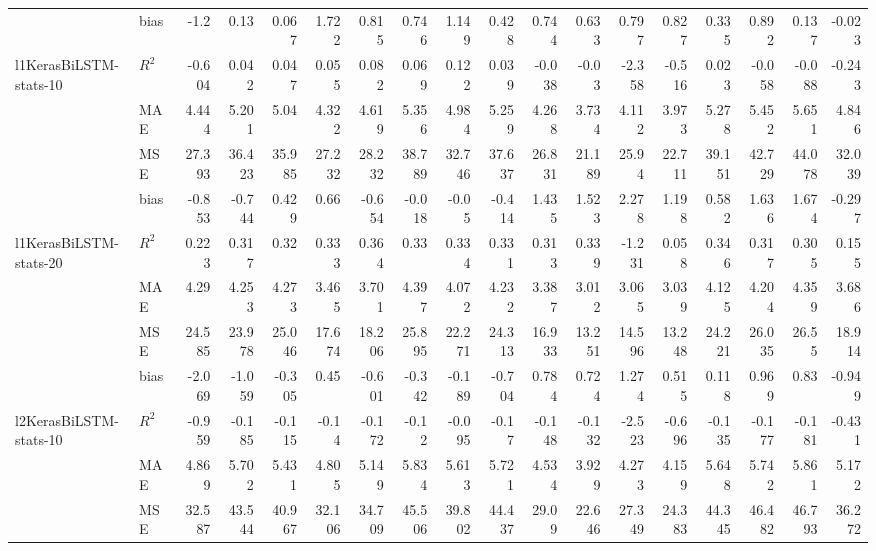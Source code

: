 \begin{tabular}{p{1.5cm}lrrrrrrrrrrrrrrrr}
                        & bias  & -1.2   &  0.13  &  0.067 &  1.722 &  0.815 &  0.746 &  1.149 &  0.428 &  0.744 &  0.633 &  0.797 &  0.827 &  0.335 &  0.892 &  0.137 & -0.023 \\
 l1KerasBiLSTM-stats-10 & $R^2$ & -0.604 &  0.042 &  0.047 &  0.055 &  0.082 &  0.069 &  0.122 &  0.039 & -0.038 & -0.03  & -2.358 & -0.516 &  0.023 & -0.058 & -0.088 & -0.243 \\
                        & MAE   &  4.444 &  5.201 &  5.04  &  4.322 &  4.619 &  5.356 &  4.984 &  5.259 &  4.268 &  3.734 &  4.112 &  3.973 &  5.278 &  5.452 &  5.651 &  4.846 \\
                        & MSE   & 27.393 & 36.423 & 35.985 & 27.232 & 28.232 & 38.789 & 32.746 & 37.637 & 26.831 & 21.189 & 25.94  & 22.711 & 39.151 & 42.729 & 44.078 & 32.039 \\
                        & bias  & -0.853 & -0.744 &  0.429 &  0.66  & -0.654 & -0.018 & -0.05  & -0.414 &  1.435 &  1.523 &  2.278 &  1.198 &  0.582 &  1.636 &  1.674 & -0.297 \\
 l1KerasBiLSTM-stats-20 & $R^2$ &  0.223 &  0.317 &  0.32  &  0.333 &  0.364 &  0.33  &  0.334 &  0.331 &  0.313 &  0.339 & -1.231 &  0.058 &  0.346 &  0.317 &  0.305 &  0.155 \\
                        & MAE   &  4.29  &  4.253 &  4.273 &  3.465 &  3.701 &  4.397 &  4.072 &  4.232 &  3.387 &  3.012 &  3.065 &  3.039 &  4.125 &  4.204 &  4.359 &  3.686 \\
                        & MSE   & 24.585 & 23.978 & 25.046 & 17.674 & 18.206 & 25.895 & 22.271 & 24.313 & 16.933 & 13.251 & 14.596 & 13.248 & 24.221 & 26.035 & 26.55  & 18.914 \\
                        & bias  & -2.069 & -1.059 & -0.305 &  0.45  & -0.601 & -0.342 & -0.189 & -0.704 &  0.784 &  0.724 &  1.274 &  0.515 &  0.118 &  0.969 &  0.83  & -0.949 \\
 l2KerasBiLSTM-stats-10 & $R^2$ & -0.959 & -0.185 & -0.115 & -0.14  & -0.172 & -0.12  & -0.095 & -0.17  & -0.148 & -0.132 & -2.523 & -0.696 & -0.135 & -0.177 & -0.181 & -0.431 \\
                        & MAE   &  4.869 &  5.702 &  5.431 &  4.805 &  5.149 &  5.834 &  5.613 &  5.721 &  4.534 &  3.929 &  4.273 &  4.159 &  5.648 &  5.742 &  5.861 &  5.172 \\
                        & MSE   & 32.587 & 43.544 & 40.967 & 32.106 & 34.709 & 45.506 & 39.802 & 44.437 & 29.09  & 22.646 & 27.349 & 24.383 & 44.345 & 46.482 & 46.793 & 36.272 \\

\end{tabular}
